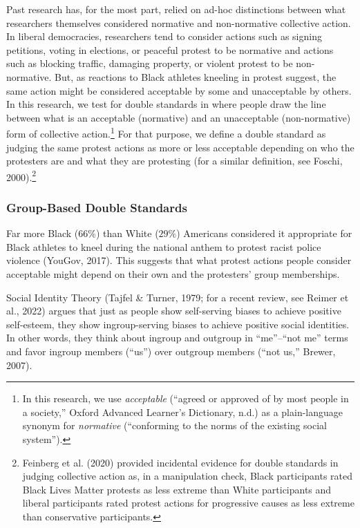 \documentclass[12pt, letterpaper]{article}
\begin{document}
Past research has, for the most part, relied on ad-hoc distinctions
between what researchers themselves considered normative and
non-normative collective action. In liberal democracies, researchers
tend to consider actions such as signing petitions, voting in elections,
or peaceful protest to be normative and actions such as blocking
traffic, damaging property, or violent protest to be non-normative. But,
as reactions to Black athletes kneeling in protest suggest, the same
action might be considered acceptable by some and unacceptable by
others. In this research, we test for double standards in where people
draw the line between what is an acceptable (normative) and an
unacceptable (non-normative) form of collective action.\footnote{In this
  research, we use \emph{acceptable} (``agreed or approved of by most
  people in a society,'' Oxford Advanced Learner's Dictionary, n.d.) as
  a plain-language synonym for \emph{normative} (``conforming to the
  norms of the existing social system'').} For that purpose, we define a
double standard as judging the same protest actions as more or less
acceptable depending on who the protesters are and what they are
protesting (for a similar definition, see Foschi, 2000).\footnote{Feinberg
  et al. (2020) provided incidental evidence for double standards in
  judging collective action as, in a manipulation check, Black
  participants rated Black Lives Matter protests as less extreme than
  White participants and liberal participants rated protest actions for
  progressive causes as less extreme than conservative participants.}

\hypertarget{group-based-double-standards}{%
\subsubsection{Group-Based Double
Standards}\label{group-based-double-standards}}

Far more Black (\(66\%\)) than White (\(29\%\)) Americans considered it
appropriate for Black athletes to kneel during the national anthem to
protest racist police violence (YouGov, 2017). This suggests that what
protest actions people consider acceptable might depend on their own and
the protesters' group memberships.

Social Identity Theory (Tajfel \& Turner, 1979; for a recent review, see
Reimer et al., 2022) argues that just as people show self-serving biases
to achieve positive self-esteem, they show ingroup-serving biases to
achieve positive social identities. In other words, they think about
ingroup and outgroup in ``me''--``not me'' terms and favor ingroup
members (``us'') over outgroup members (``not us,'' Brewer, 2007).
\end{document}
